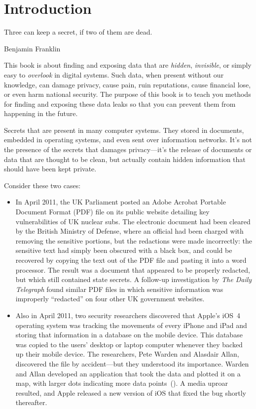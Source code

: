 \chapter{Introduction}
\setlength{\epigraphwidth}{3in}
\epigraph{Three can keep a secret, if two of them are dead.}{Benjamin
  Franklin}

This book is about finding and exposing data that are \emph{hidden}, \emph{invisible}, or simply
easy to \emph{overlook} in digital systems. Such data, when present
without our knowledge, can damage privacy, cause pain, ruin
reputations, cause financial lose, or even harm national security. The
purpose of this book is to teach you methods for finding and exposing
these data leaks so that you can prevent them from happening in the
future.

Secrets that are present in many computer systems. They stored in
documents, embedded in operating systems, and even sent over
information networks. It's not the presence of the secrets that
damages privacy---it's the release of documents or data that are
thought to be clean, but actually contain hidden information that
should have been kept private. 

Consider these two cases:

\begin{itemize}
\item In April 2011, the UK Parliament posted an Adobe Acrobat Portable
Document Format (PDF) file on its public website detailing key
vulnerabilities of UK nuclear subs. The electronic document had been
cleared by the British Ministry of Defense, where an official had been
charged with removing the sensitive portions, but the redactions were
made incorrectly: the sensitive text had simply been obscured with a
black box, and could be recovered by copying the text out of the PDF
file and pasting it into a word processor. The result was a document
that appeared to be properly redacted, but which still contained state
secrets.  A follow-up investigation by \emph{The Daily Telegraph}
found similar PDF files in which sensitive information was improperly
``redacted'' on four other UK government
websites\cite{telegraph-april2011-secrets}.

\item Also in April 2011, two security researchers discovered that
Apple's iOS~4 operating system was tracking the movements of every
iPhone and iPad and storing that information in a database on the
mobile device. This database was copied to the users'
desktop or laptop computer whenever they backed up their mobile
device. The researchers, Pete Warden and Alasdair Allan, discovered
the file by accident---but they understood its
importance\cite{apple-tracking}. Warden and Allan developed an application that
took the data and plotted it on a map, with larger dots indicating
more data points~(). A media uproar resulted, and
Apple released a new version of iOS that fixed the bug shortly
thereafter\cite{apple-tracking-statement}. 

\end{itemize}


